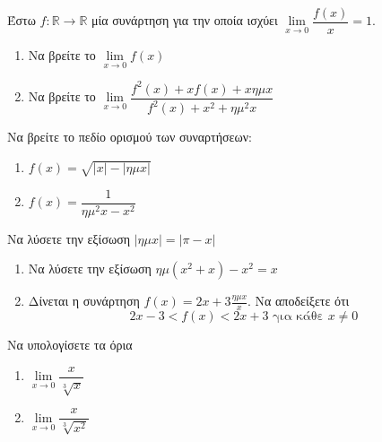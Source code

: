 \documentclass{presentation}
\begin{document}
\begin{askisi}
  Έστω $f:\mathbb{R}\to\mathbb{R}$ μία συνάρτηση για την οποία ισχύει $\lim\limits_{x \to 0}{ \dfrac{f(x)}{x} }=1$.
  \begin{enumerate}
    \item Να βρείτε το $\lim\limits_{x \to 0}{f(x)}$ \pause
    \item Να βρείτε το $\lim\limits_{x \to 0}{\dfrac{f^2(x)+xf(x)+xημx}{f^2(x)+x^2+ημ^2x}}$
  \end{enumerate}

\end{askisi}

\begin{askisi}
  Να βρείτε το πεδίο ορισμού των συναρτήσεων:
  \begin{enumerate}
    \item $f(x)=\sqrt{|x|-|ημx|}$ \pause
    \item $f(x)=\dfrac{1}{ημ^2x-x^2}$
  \end{enumerate}

\end{askisi}

\begin{askisi}
  Να λύσετε την εξίσωση $|ημx|=|π-x|$

\end{askisi}

\begin{askisi}
  \begin{enumerate}
    \item Να λύσετε την εξίσωση $ημ(x^2+x)-x^2=x$ \pause
    \item Δίνεται η συνάρτηση $f(x)=2x+3\frac{ημx}{x}$. Να αποδείξετε ότι
          $$2x-3<f(x)<2x+3 \text{ για κάθε } x\ne 0$$
  \end{enumerate}

\end{askisi}

\begin{askisi}
  Να υπολογίσετε τα όρια
  \begin{enumerate}
    \item $\lim\limits_{x \to 0}{ \dfrac{x}{\sqrt[3]{x}} }$ \pause
    \item $\lim\limits_{x \to 0}{ \dfrac{x}{\sqrt[3]{x^2}} }$
  \end{enumerate}

\end{askisi}
\end{document}
